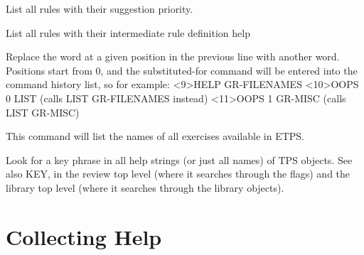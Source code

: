\begin{description}
\item[\parbox{\textwidth}{LIST-RULES}]  
List all rules with their suggestion priority.

\item[\parbox{\textwidth}{LIST-RULES*}]  
List all rules with their intermediate rule definition help

\item[\parbox{\textwidth}{OOPS \textit{position} \textit{replacement}}]  
Replace the word at a given position in the previous line
with another word. Positions start from 0, and the substituted-for
command will be entered into the command history list, so for example:
<9>HELP GR-FILENAMES
<10>OOPS 0 LIST      (calls LIST GR-FILENAMES instead)
<11>OOPS 1 GR-MISC   (calls LIST GR-MISC)

\item[\parbox{\textwidth}{PROBLEMS \textit{show-defns}}]  
This command will list the names of all exercises available in ETPS.

\item[\parbox{\textwidth}{SEARCH \textit{phrase} \textit{search-names}}]  
Look for a key phrase in all help strings (or just all names) 
of TPS objects. See also KEY, in the review top level (where it searches 
through the flags) and the library top level (where it searches through
the library objects).
\item
\end{description}

\section{Collecting Help}

